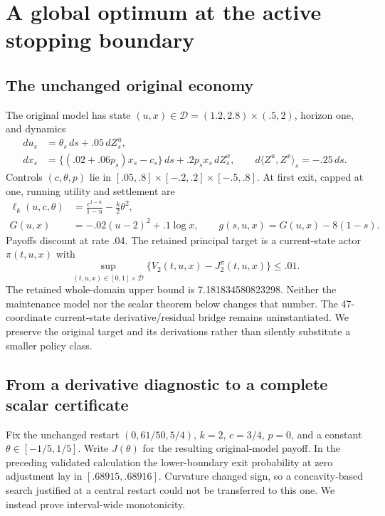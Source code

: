 \section{A global optimum at the active stopping boundary}\label{sec:stopped}
\subsection{The unchanged original economy}
The original model has state $(u,x)\in\mathcal D=(1.2,2.8)\times(.5,2)$, horizon one, and dynamics
\begin{align}
 du_s&=\theta_s\,ds+.05\,dZ_s^u,\\
 dx_s&=\{(.02+.06p_s)x_s-c_s\}\,ds+.2p_sx_s\,dZ_s^x,
 \qquad d\langle Z^u,Z^x\rangle_s=-.25\,ds.
\end{align}
Controls $(c,\theta,p)$ lie in $[.05,.8]\times[-.2,.2]\times[-.5,.8]$. At first exit, capped at one, running utility and settlement are
\begin{align}
 \ell_k(u,c,\theta)&=\frac{c^{1-u}}{1-u}-\frac{k}{2}\theta^2,\\
 G(u,x)&=-.02(u-2)^2+.1\log x,\qquad
 g(s,u,x)=G(u,x)-8(1-s).
\end{align}
Payoffs discount at rate .04. The retained principal target is a current-state actor $\pi(t,u,x)$ with
\begin{equation}\label{eq:original}
 \sup_{(t,u,x)\in[0,1]\times\overline{\mathcal D}}
 \{V_2(t,u,x)-J_2^\pi(t,u,x)\}\le .01.
\end{equation}
The retained whole-domain upper bound is 7.181834580823298. Neither the maintenance model nor the scalar theorem below changes that number. The 47-coordinate current-state derivative/residual bridge remains uninstantiated. We preserve the original target and its derivations rather than silently substitute a smaller policy class.

\subsection{From a derivative diagnostic to a complete scalar certificate}
Fix the unchanged restart $(0,61/50,5/4)$, $k=2$, $c=3/4$, $p=0$, and a constant $\theta\in[-1/5,1/5]$. Write $J(\theta)$ for the resulting original-model payoff. In the preceding validated calculation the lower-boundary exit probability at zero adjustment lay in $[.68915,.68916]$. Curvature changed sign, so a concavity-based search justified at a central restart could not be transferred to this one. We instead prove interval-wide monotonicity.


